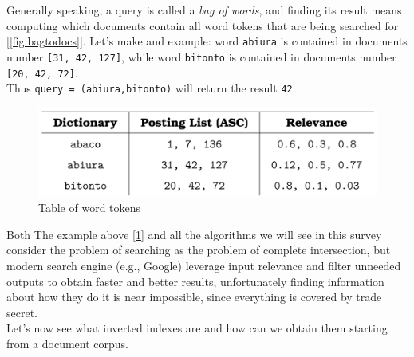 Generally speaking, a query is called a \textit{bag of words}, and finding its result means computing which documents contain all word tokens that are being searched for [\ref{fig:bagtodocs}]. Let's make and example: word \verb+abiura+ is contained in documents number \verb+[31, 42, 127]+, while word \verb+bitonto+ is contained in documents number \verb+[20, 42, 72]+. \\
Thus \verb|query = (abiura,bitonto)| will return the result \verb+42+. \\

\begin{figure}[ht] 
\begin{center}
\includegraphics[width=.8\textwidth]{imgs/table_of_words.png}
\caption{Table of word tokens\label{fig:table_wtokens}}
\end{center}
\end{figure}

Both The example above [\ref{fig:table_wtokens}] and all the algorithms we will see in this survey consider the problem of searching as the problem of complete intersection, but modern search engine (e.g., Google)  leverage input relevance and filter unneeded outputs to obtain faster and better results, unfortunately finding information about how they do it is near impossible, since everything is covered by trade secret. \\
Let's now see what inverted indexes are and how can we obtain them starting from a document corpus.


